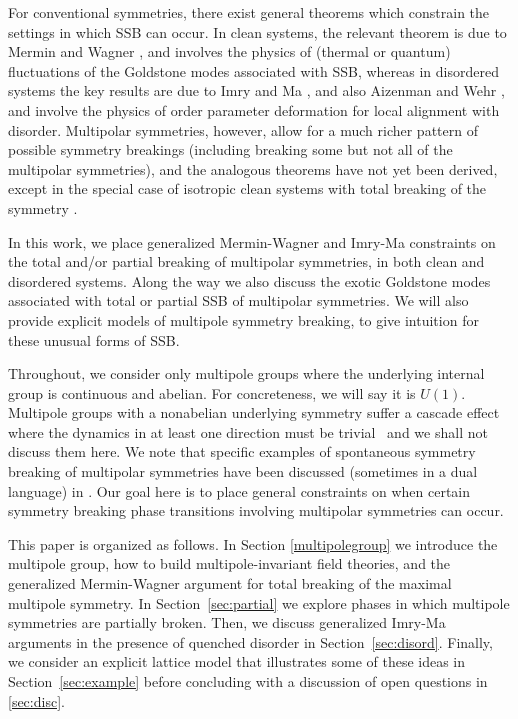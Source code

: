 \documentclass[pra,aps,twocolumn, amsfonts,amsmath,amssymb,nofootinbib,superscriptaddress]{revtex4}
\begin{document}
For conventional symmetries, there exist general theorems which constrain the settings in which SSB can occur. In clean systems, the relevant theorem is due to Mermin and Wagner \cite{MerminWagner}, and involves the physics of (thermal or quantum) fluctuations of the Goldstone modes associated with SSB, whereas in disordered systems the key results are due to Imry and Ma \cite{ImryMa, Vojta2013}, and also Aizenman and Wehr \cite{Aizenman}, and involve the physics of order parameter deformation for local alignment with disorder. Multipolar symmetries, however, allow for a much richer pattern of possible symmetry breakings (including breaking some but not all of the multipolar symmetries), and the analogous theorems have not yet been derived, except in the special case of isotropic clean systems with total breaking of the symmetry \cite{Griffin2013Multi}.

In this work, we place generalized Mermin-Wagner and Imry-Ma constraints on the total and/or partial breaking of multipolar symmetries, in both clean and disordered systems. Along the way we also discuss the exotic Goldstone modes associated with total or partial SSB of multipolar symmetries. We will also provide explicit models of multipole symmetry breaking, to give intuition for these unusual forms of SSB. 

Throughout, we consider only multipole groups where the underlying internal group is continuous and abelian. For concreteness, we will say it is $U(1)$. Multipole groups with a nonabelian underlying symmetry suffer a cascade effect where the dynamics in at least one direction must be trivial~\cite{nonabelian} and we shall not discuss them here. We note that specific examples of spontaneous symmetry breaking of multipolar symmetries have been discussed (sometimes in a dual language) in \cite{elastic1, elastic2, elastic3, elastic4, elastic5, FS1, FS2}. Our goal here is to place general constraints on when certain symmetry breaking phase transitions involving multipolar symmetries can occur. 

This paper is organized as follows. In Section \ref{multipolegroup} we introduce the multipole group, how to build multipole-invariant field theories, and the generalized Mermin-Wagner argument for total breaking of the maximal multipole symmetry. In Section~\ref{sec:partial} we explore phases in which multipole symmetries are partially broken.
Then, we discuss generalized Imry-Ma arguments in the presence of quenched disorder in Section~\ref{sec:disord}. Finally, we consider an explicit lattice model that illustrates some of these ideas in Section~\ref{sec:example} before concluding with a discussion of open questions in \ref{sec:disc}.
\end{document}
